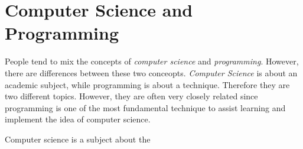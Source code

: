 \documentclass[../main.tex]{subfiles}
\begin{document}
    \section{Computer Science and Programming}
    People tend to mix the concepts of \emph{computer science} and \emph{programming}.
    However, there are differences between these two conceopts. \emph{Computer Science}
    is about an academic subject, while programming is about a technique.
    Therefore they are two different topics. However, they are often very closely
    related since programming is one of the most fundamental technique to assist
    learning and implement the idea of computer science.
    
    Computer science is a subject about the 
\end{document}
